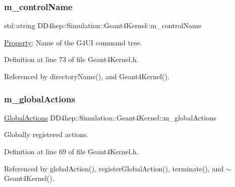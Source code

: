 \subsubsection{\texorpdfstring{m\+\_\+control\+Name}{m\_controlName}}
{\footnotesize\ttfamily std\+::string D\+D4hep\+::\+Simulation\+::\+Geant4\+Kernel\+::m\+\_\+control\+Name\hspace{0.3cm}{\ttfamily [protected]}}



\hyperlink{class_d_d4hep_1_1_property}{Property}\+: Name of the G4\+UI command tree. 



Definition at line 73 of file Geant4\+Kernel.\+h.



Referenced by directory\+Name(), and Geant4\+Kernel().

\hypertarget{class_d_d4hep_1_1_simulation_1_1_geant4_kernel_a23bac03e5a169b5fc9446e574ad034ac}{}\label{class_d_d4hep_1_1_simulation_1_1_geant4_kernel_a23bac03e5a169b5fc9446e574ad034ac} 
\subsubsection{\texorpdfstring{m\+\_\+global\+Actions}{m\_globalActions}}
{\footnotesize\ttfamily \hyperlink{class_d_d4hep_1_1_simulation_1_1_geant4_kernel_a9cd070dfd06f049aa11b56688faaa643}{Global\+Actions} D\+D4hep\+::\+Simulation\+::\+Geant4\+Kernel\+::m\+\_\+global\+Actions\hspace{0.3cm}{\ttfamily [protected]}}



Globally registered actions. 



Definition at line 69 of file Geant4\+Kernel.\+h.



Referenced by global\+Action(), register\+Global\+Action(), terminate(), and $\sim$\+Geant4\+Kernel().

\hypertarget{class_d_d4hep_1_1_simulation_1_1_geant4_kernel_afab7f53720ce6b7255ff54d777c4ff4e}{}\label{class_d_d4hep_1_1_simulation_1_1_geant4_kernel_afab7f53720ce6b7255ff54d777c4ff4e} 
